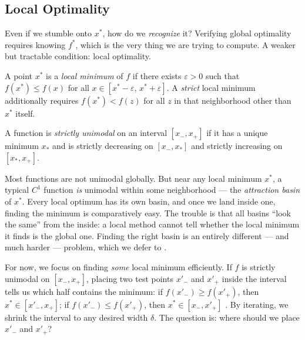 \subsection{Local Optimality}\label{ssec:local-opt}

Even if we stumble onto $x^*$, how do we \emph{recognize} it?
Verifying global optimality requires knowing $f^*$, which is the very thing we are trying to compute.
A weaker but tractable condition: local optimality.

\begin{defn}\label{def:local-min}
	A point $x^*$ is a \textit{local minimum} of $f$ if there exists $\varepsilon > 0$ such that $f(x^*) \leq f(x)$ for all $x \in [x^* - \varepsilon,\, x^* + \varepsilon]$.
	A \textit{strict} local minimum additionally requires $f(x^*) < f(z)$ for all $z$ in that neighborhood other than $x^*$ itself.
\end{defn}

\begin{defn}\label{def:unimodal}
	A function is \textit{strictly unimodal} on an interval $[x_-, x_+]$ if it has a unique minimum $x_*$ and is strictly decreasing on $[x_-, x_*]$ and strictly increasing on $[x_*, x_+]$.
\end{defn}

Most functions are not unimodal globally.
But near any local minimum $x^*$, a typical $C^1$ function \emph{is} unimodal within some neighborhood --- the \textit{attraction basin} of $x^*$.
Every local optimum has its own basin, and once we land inside one, finding the minimum is comparatively easy.
The trouble is that all basins ``look the same'' from the inside: a local method cannot tell whether the local minimum it finds is the global one.
Finding the right basin is an entirely different --- and much harder --- problem, which we defer to .

For now, we focus on finding \emph{some} local minimum efficiently.
If $f$ is strictly unimodal on $[x_-, x_+]$, placing two test points $x'_-$ and $x'_+$ inside the interval tells us which half contains the minimum:
if $f(x'_-) \geq f(x'_+)$, then $x^* \in [x'_-, x_+]$;
if $f(x'_-) \leq f(x'_+)$, then $x^* \in [x_-, x'_+]$ \cite{bazaraa2006}.
By iterating, we shrink the interval to any desired width $\delta$.
The question is: where should we place $x'_-$ and $x'_+$?



